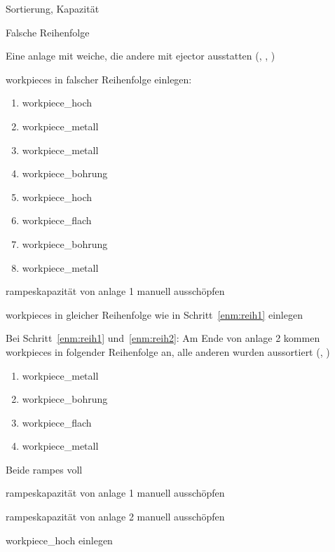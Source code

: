 \begin{abntest}{Sortierung, Kapazität}
    \begin{ablauf}{Falsche Reihenfolge}
        \item Eine \gls{anlage} mit \gls{weiche}, die andere mit \gls{ejector} ausstatten
        (, , )
        \item \Glspl{workpiece} in falscher Reihenfolge einlegen:\label{enm:reih1}
        \begin{enumerate}
            \item \gls{workpiece_hoch} %
            \item \gls{workpiece_metall}
            \item \gls{workpiece_metall} %
            \item \gls{workpiece_bohrung}
            \item \gls{workpiece_hoch} %
            \item \gls{workpiece_flach}
            \item \gls{workpiece_bohrung} %
            \item \gls{workpiece_metall}
        \end{enumerate}
        \item \Glspl{rampe}kapazität von \gls{anlage} 1 manuell ausschöpfen
        \item \Glspl{workpiece} in gleicher Reihenfolge wie in
        Schritt~\ref{enm:reih1} einlegen\label{enm:reih2}
    \end{ablauf}

    \begin{erwartung}
        \item Bei Schritt~\ref{enm:reih1} und~\ref{enm:reih2}: Am Ende von \gls{anlage} 2 kommen
        \Glspl{workpiece} in folgender Reihenfolge an,
        alle anderen wurden aussortiert (, )
        \begin{enumerate}
            \item \gls{workpiece_metall}
            \item \gls{workpiece_bohrung}
            \item \gls{workpiece_flach}
            \item \gls{workpiece_metall}
        \end{enumerate}
    \end{erwartung}

    \begin{ablauf}{Beide \glspl{rampe} voll}
        \item \Glspl{rampe}kapazität von \gls{anlage} 1 manuell ausschöpfen\label{enm:rampe1-voll}
        \item \Glspl{rampe}kapazität von \gls{anlage} 2 manuell ausschöpfen\label{enm:rampe2-voll}
        \item \gls{workpiece_hoch} einlegen\label{enm:beide-rutschen-voll-und-einlegen}
    \end{ablauf}


\end{abntest}
